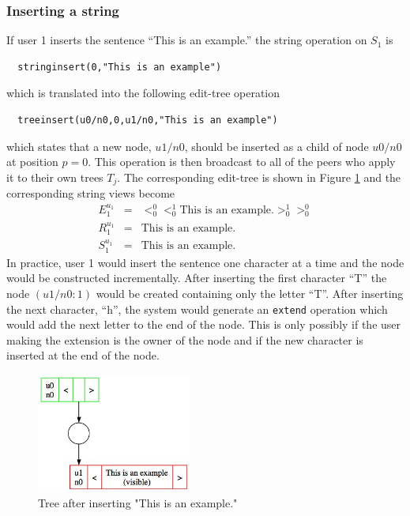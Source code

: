 \documentclass{amsart}
\begin{document}
\subsubsection{Inserting a string}

If user 1 inserts the sentence ``This is an example.'' 
the string operation on $S_1$ is
\begin{verbatim}
  stringinsert(0,"This is an example")
\end{verbatim}
which is translated into the following edit-tree operation
\begin{verbatim}
  treeinsert(u0/n0,0,u1/n0,"This is an example")
\end{verbatim}
which states that a new node, $u1/n0$, should be inserted as a child of
node $u0/n0$ at position $p=0$. This operation is then broadcast to all of the
peers who apply it to their own trees $T_j$.
The corresponding edit-tree is shown in Figure \ref{fig:tree0} and the
corresponding string views become 
\begin{align*}
E^{u_1}_1 &=& <_0^0 <_0^1 \text{This  is  an  example.}>_0^1 >_0^0\\
R^{u_1}_1 &=& \text{This  is  an  example.}\\
S^{u_1}_1 &=& \text{This  is  an  example.}
\end{align*}
In practice, user 1 would insert the sentence one character at a time
and the node would be constructed incrementally.
After inserting the first character ``T'' the node $(u1/n0:1)$ would be created
containing only the letter ``T''. After inserting the next character, ``h'',
the system would generate an {\tt extend} operation which would add the
next letter to the end of the node. This is only possibly if the user making
the extension is the owner of the node and if the new character is inserted
at the end of the node.



\begin{figure}[h]
\centering
\includegraphics[width=2.0in]{tree1zz.jpg}
\caption{Tree after inserting "This is an example.\label{fig:tree0}"}
\end{figure}
\end{document}
